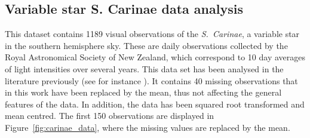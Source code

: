 \documentclass[twocolumn,final]{svjour3}
\begin{document}

\subsection{Variable star S. Carinae data analysis}

This dataset contains 1189 visual observations of the {\it S.\ Carinae}, a variable star in the southern hemisphere sky.  These are daily observations collected by the Royal Astronomical Society of New Zealand, which correspond to 10 day averages of light intensities over several years.  This data set has been analysed in the literature previously (see for instance \cite{Cart:1997,Huerta:1999,Kirch:2018}).  It contains 40 missing observations that in this work have been replaced by the mean, thus not affecting the general features of the data.  In addition, the data has been squared root transformed and mean centred.  The first 150 observations are displayed in Figure~\ref{fig:carinae_data}, where the missing values are replaced by the mean.  
\end{document}
